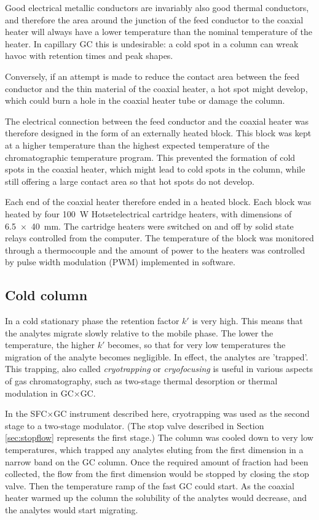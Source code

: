 Good electrical metallic conductors are invariably also good thermal conductors,
and therefore the area around the junction of the feed conductor to the coaxial
heater will always have a lower temperature than the nominal temperature of the
heater. In capillary GC this is undesirable: a cold spot in a column can wreak
havoc with retention times and peak shapes.

Conversely, if an attempt is made to reduce the contact area between the feed
conductor and the thin material of the coaxial heater, a hot spot might develop,
which could burn a hole in the coaxial heater tube or damage the column.

The electrical connection between the feed conductor and the coaxial heater was
therefore designed in the form of an externally heated block. This block was
kept at a higher temperature than the highest expected temperature of the
chromatographic temperature program. This prevented the formation of cold spots
in the coaxial heater, which might lead to cold spots in the column, while still
offering a large contact area so that hot spots do not develop.

Each end of the coaxial heater therefore ended in a heated block. Each block was
heated by four \SI{100}{\watt} Hotset\texttrademark{}electrical cartridge
heaters, with dimensions of \SI{6.5 x 40}{\milli\metre}. The cartridge heaters
were switched on and off by solid state relays controlled from the computer. The
temperature of the block was monitored through a thermocouple and the amount of
power to the heaters was controlled by pulse width modulation (PWM) implemented
in software. \todo
 
\subsection{Cold column}

In a cold stationary phase the retention factor \(k'\) is very high. This means
that the analytes migrate slowly relative to the mobile phase. The lower the
temperature, the higher \(k'\) becomes, so that for very low temperatures the
migration of the analyte becomes negligible. In effect, the analytes are
'trapped'. This trapping, also called \textit{cryotrapping} or
\textit{cryofocusing} is useful in various aspects of gas chromatography, such
as two-stage thermal desorption or thermal modulation in GC×GC. 


In the SFC×GC instrument described here, cryotrapping was used as the second
stage to a two-stage modulator. (The stop valve described in Section
\ref{sec:stopflow} represents the first stage.) The column was cooled down to
very low temperatures, which trapped any analytes eluting from the first
dimension in a narrow band on the GC column. Once the required amount of
fraction had been collected, the flow from the first dimension would be stopped
by closing the stop valve. Then the temperature ramp of the fast GC could start.
As the coaxial heater warmed up the column the solubility of the analytes would
decrease, and the analytes would start migrating.

